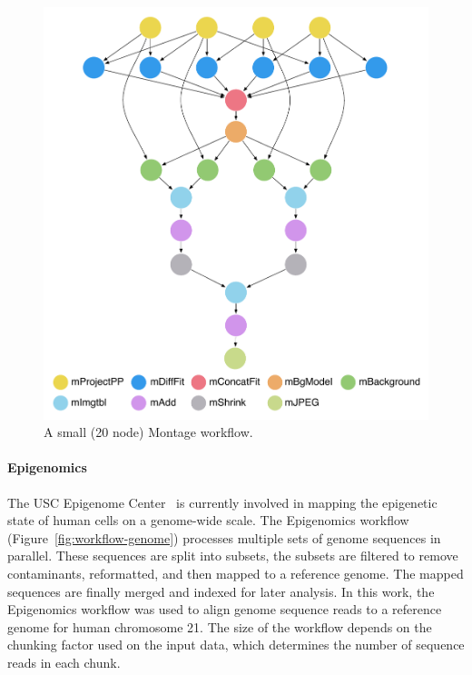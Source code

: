 \begin{figure}[!t]
	\centering
	\includegraphics[width=0.85\linewidth]{figures/workflow-montage}
	\caption{A small (20 node) Montage workflow.}
	\label{fig:workflow-montage}
\end{figure}


\paragraph{\textbf{Epigenomics}}
The USC Epigenome Center~\cite{genome} is currently involved in mapping the epigenetic 
state of human cells on a genome-wide scale. The Epigenomics workflow 
(Figure~\ref{fig:workflow-genome}) processes multiple sets of genome sequences in
parallel. These sequences are split into subsets, the subsets are filtered to remove
contaminants, reformatted, and then mapped to a reference genome. The mapped sequences are
finally merged and indexed for later analysis. In this work, the Epigenomics workflow was 
used to align genome sequence reads to a reference genome for human chromosome 
21. The size of the workflow depends on the chunking factor used on the input data, 
which determines the number of sequence reads in each chunk.


